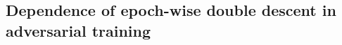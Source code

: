 
\subsection{Dependence of epoch-wise double descent in adversarial training}
\label{sect:double-descent-adversarial}





